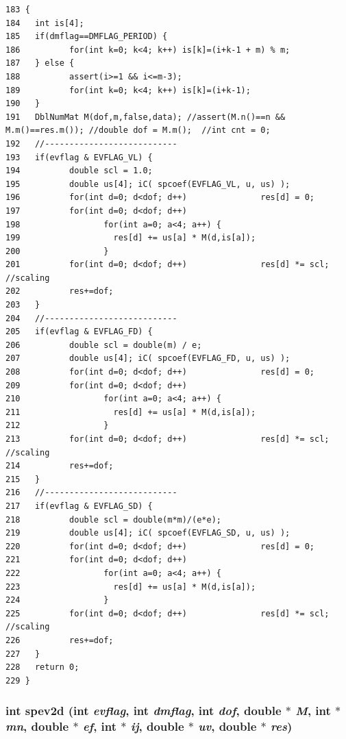 \footnotesize\begin{verbatim}183 {
184   int is[4];
185   if(dmflag==DMFLAG_PERIOD) {
186          for(int k=0; k<4; k++) is[k]=(i+k-1 + m) % m;
187   } else {
188          assert(i>=1 && i<=m-3);
189          for(int k=0; k<4; k++) is[k]=(i+k-1);
190   }
191   DblNumMat M(dof,m,false,data); //assert(M.n()==n && M.m()==res.m()); //double dof = M.m();  //int cnt = 0;
192   //---------------------------
193   if(evflag & EVFLAG_VL) {
194          double scl = 1.0;
195          double us[4]; iC( spcoef(EVFLAG_VL, u, us) );
196          for(int d=0; d<dof; d++)               res[d] = 0;
197          for(int d=0; d<dof; d++) 
198                 for(int a=0; a<4; a++) {
199                   res[d] += us[a] * M(d,is[a]);
200                 }
201          for(int d=0; d<dof; d++)               res[d] *= scl; //scaling
202          res+=dof;
203   }
204   //---------------------------
205   if(evflag & EVFLAG_FD) {
206          double scl = double(m) / e;
207          double us[4]; iC( spcoef(EVFLAG_FD, u, us) );
208          for(int d=0; d<dof; d++)               res[d] = 0;
209          for(int d=0; d<dof; d++)
210                 for(int a=0; a<4; a++) {
211                   res[d] += us[a] * M(d,is[a]);
212                 }
213          for(int d=0; d<dof; d++)               res[d] *= scl; //scaling
214          res+=dof;
215   }
216   //---------------------------
217   if(evflag & EVFLAG_SD) {
218          double scl = double(m*m)/(e*e);
219          double us[4]; iC( spcoef(EVFLAG_SD, u, us) );
220          for(int d=0; d<dof; d++)               res[d] = 0;
221          for(int d=0; d<dof; d++)
222                 for(int a=0; a<4; a++) {
223                   res[d] += us[a] * M(d,is[a]);
224                 }
225          for(int d=0; d<dof; d++)               res[d] *= scl; //scaling
226          res+=dof;
227   }
228   return 0;
229 }
\end{verbatim}\normalsize 


\subsubsection{\setlength{\rightskip}{0pt plus 5cm}int spev2d (int {\em evflag}, int {\em dmflag}, int {\em dof}, double $\ast$ {\em M}, int $\ast$ {\em mn}, double $\ast$ {\em ef}, int $\ast$ {\em ij}, double $\ast$ {\em uv}, double $\ast$ {\em res})}\label{vecmatop_8hpp_2bd003f61d68382b102b1f7747d42016_2bd003f61d68382b102b1f7747d42016}




